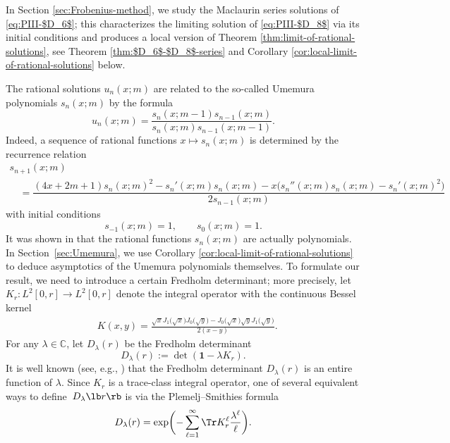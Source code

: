 In Section \ref{sec:Frobenius-method}, we study the Maclaurin series solutions of \eqref{eq:PIII-$D_6$}; this characterizes the limiting solution of \eqref{eq:PIII-$D_8$} via its initial conditions and produces a local version of Theorem \ref{thm:limit-of-rational-solutions}, see Theorem \ref{thm:$D_6$-$D_8$-series} and Corollary \ref{cor:local-limit-of-rational-solutions} below.

The rational solutions $u_n(x;m)$ are related to the so-called Umemura polynomials $s_n(x;m)$ by the formula
\begin{equation}
u_n(x;m)=\dfrac{s_n(x;m-1)s_{n-1}(x;m)}{s_n(x;m)s_{n-1}(x;m-1)}.
\label{eq:un-polys}
\end{equation}
Indeed, a sequence of rational functions $x\mapsto s_n(x;m)$ is determined by the recurrence relation
\begin{gather}
s_{n+1}(x;m)\nonumber\\
\quad=\dfrac{(4x+2m+1)s_n(x;m)^2-s_n'(x;m)s_n(x;m)-x\big(s_n''(x;m)s_n(x;m)-s_n'(x;m)^2\big)}{2s_{n-1}(x;m)}
\label{eq:umemura-recurrence}
\end{gather}
with initial conditions
\begin{equation}\label{eq:umemura-recurrence_init}
s_{-1}(x;m)=1,\qquad s_{0}(x;m)=1.
\end{equation}
It was shown in \cite{clarkson2018constructive,Umemura} that the rational functions $s_n(x;m)$ are actually polynomials. In Section~\ref{sec:Umemura}, we use Corollary \ref{cor:local-limit-of-rational-solutions} to deduce asymptotics of the Umemura polynomials themselves. To formulate our result, we need to introduce a certain Fredholm determinant; more precisely, let $K_r\colon L^2[0, r] \to L^2[0, r]$ denote the integral operator with the continuous Bessel kernel
 	\begin{align*}
 	&K(x,y)=\frac{\sqrt{x}J_1\big( \sqrt x\big) J_0\big(\sqrt y\big)-
 	 J_0\big(\sqrt x\big) \sqrt{y}J_1\big( \sqrt y\big)}{2( x-y)}.
 	\end{align*}
For any $\lambda\in\mathbb C$, let $D_\lambda( r)$ be the Fredholm determinant
\[%
 	D_\lambda( r) :=\det ( \mathbf 1-\lambda K_r).
\]
It is well known (see, e.g., \cite[Chapter 24]{Lax}) that the Fredholm determinant $D_\lambda( r)$ is an entire function of $\lambda$. Since $K_r$ is a trace-class integral operator, one of several equivalent ways to define~$D_\lambda\lb r\rb$ is via the Plemelj--Smithies formula
 \begin{gather}
 D_\lambda( r)=\exp\biggl(-\sum_{\ell=1}^\infty \Tr K_r^{\ell} \frac{\lambda^\ell}{\ell}\biggr).
 \label{eq:plemelj-smithies}
 \end{gather}
